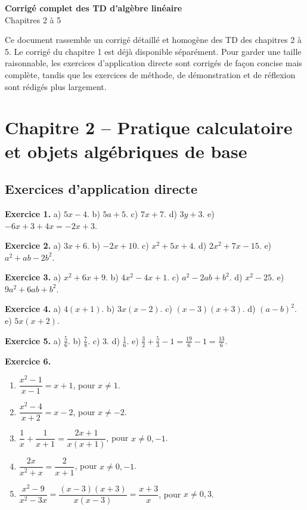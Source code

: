 \documentclass[11pt,a4paper]{article}
\begin{document}
\begin{center}
{\LARGE\bfseries Corrigé complet des TD d'algèbre linéaire}\\[0.4em]
{\large Chapitres 2 à 5}\\[0.8em]
\end{center}
\begin{info}
Ce document rassemble un corrigé détaillé et homogène des TD des chapitres 2 à 5. Le corrigé du chapitre 1 est déjà disponible séparément. Pour garder une taille raisonnable, les exercices d'application directe sont corrigés de façon concise mais complète, tandis que les exercices de méthode, de démonstration et de réflexion sont rédigés plus largement.
\end{info}
\tableofcontents
\newpage
\section{Chapitre 2 -- Pratique calculatoire et objets algébriques de base}
\subsection*{Exercices d'application directe}
\textbf{Exercice 1.} a) $5x-4$. b) $5a+5$. c) $7x+7$. d) $3y+3$. e) $-6x+3+4x=-2x+3$.

\textbf{Exercice 2.} a) $3x+6$. b) $-2x+10$. c) $x^2+5x+4$. d) $2x^2+7x-15$. e) $a^2+ab-2b^2$.

\textbf{Exercice 3.} a) $x^2+6x+9$. b) $4x^2-4x+1$. c) $a^2-2ab+b^2$. d) $x^2-25$. e) $9a^2+6ab+b^2$.

\textbf{Exercice 4.} a) $4(x+1)$. b) $3x(x-2)$. c) $(x-3)(x+3)$. d) $(a-b)^2$. e) $5x(x+2)$.

\textbf{Exercice 5.} a) $\frac56$. b) $\frac78$. c) $3$. d) $\frac16$. e) $\frac32+\frac53-1=\frac{19}{6}-1=\frac{13}{6}$.

\textbf{Exercice 6.}
\begin{enumerate}[label=\alph*)]
\item $\dfrac{x^2-1}{x-1}=x+1$, pour $x\neq 1$.
\item $\dfrac{x^2-4}{x+2}=x-2$, pour $x\neq -2$.
\item $\dfrac1x+\dfrac1{x+1}=\dfrac{2x+1}{x(x+1)}$, pour $x\neq 0,-1$.
\item $\dfrac{2x}{x^2+x}=\dfrac{2}{x+1}$, pour $x\neq 0,-1$.
\item $\dfrac{x^2-9}{x^2-3x}=\dfrac{(x-3)(x+3)}{x(x-3)}=\dfrac{x+3}{x}$, pour $x\neq 0,3$.
\end{enumerate}
\end{document}

